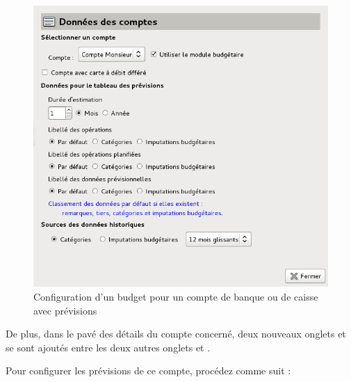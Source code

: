 \ifIllustration
\begin{figure}[ht]
\begin{center}
\includegraphics[scale=0.5]{image/screenshot/setup_budget_dataBank}
\end{center}
\caption{Configuration d'un budget pour un compte de banque ou de caisse avec prévisions}
\label{setup_budget_dataBank-img}
\end{figure}
\fi

De plus, dans le pavé des détails du compte concerné, deux nouveaux onglets  et  se sont ajoutés entre les deux autres onglets  et .

Pour configurer les prévisions de ce compte, procédez comme suit :

